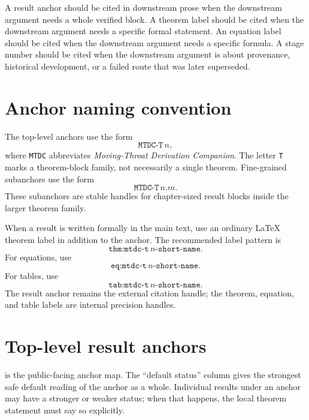 A result anchor should be cited in downstream prose when the downstream argument needs a whole verified block.  A theorem label should be cited when the downstream argument needs a specific formal statement.  An equation label should be cited when the downstream argument needs a specific formula.  A stage number should be cited when the downstream argument is about provenance, historical development, or a failed route that was later superseded.

\section{Anchor naming convention}
\label{sec:anchor-naming-convention}

The top-level anchors use the form
\[
  \texttt{MTDC-T}\,n,
\]
where \texttt{MTDC} abbreviates \emph{Moving-Throat Derivation Companion}.  The letter \texttt{T} marks a theorem-block family, not necessarily a single theorem.  Fine-grained subanchors use the form
\[
  \texttt{MTDC-T}\,n\texttt{.}m.
\]
These subanchors are stable handles for chapter-sized result blocks inside the larger theorem family.

When a result is written formally in the main text, use an ordinary LaTeX theorem label in addition to the anchor.  The recommended label pattern is
\[
  \texttt{thm:mtdc-t}\,n\texttt{-short-name}.
\]
For equations, use
\[
  \texttt{eq:mtdc-t}\,n\texttt{-short-name}.
\]
For tables, use
\[
  \texttt{tab:mtdc-t}\,n\texttt{-short-name}.
\]
The result anchor remains the external citation handle; the theorem, equation, and table labels are internal precision handles.

\section{Top-level result anchors}
\label{sec:top-level-result-anchors}

 is the public-facing anchor map.  The ``default status'' column gives the strongest safe default reading of the anchor as a whole.  Individual results under an anchor may have a stronger or weaker status; when that happens, the local theorem statement must say so explicitly.

